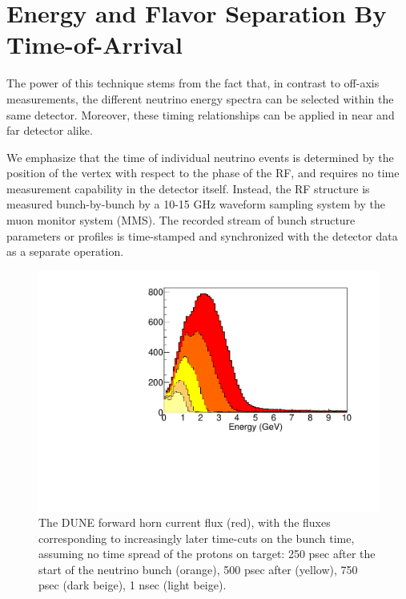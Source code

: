\section{Energy and Flavor Separation By Time-of-Arrival}
\label{mechanism}

The power of this technique stems from the fact that, in contrast to
off-axis measurements, the different neutrino energy spectra can be
selected within the same detector. Moreover, these timing
relationships can be applied in near and far detector alike. 

We emphasize that the time of individual neutrino events is determined
by the position of the vertex with respect to the phase of the RF, and
requires no time measurement capability in the detector
itself. Instead, the RF
structure is measured bunch-by-bunch by a 10-15 GHz waveform sampling
system by the muon monitor system (MMS). The recorded stream of bunch 
structure parameters or profiles is time-stamped and synchronized with
the detector data as a separate operation.

\begin{figure}[t]
	\begin{center}
        \includegraphics[width=0.5\linewidth]{Figures/2018.10.10_LBNFtiming/DUNEbeam_truetimingB.pdf}
	\end{center}
	\caption{The DUNE forward horn current flux (red), with the
          fluxes corresponding to increasingly later time-cuts on the
          bunch time, assuming no time spread of the protons on
          target: 250 psec after the start of the neutrino bunch
          (orange), 500 psec after (yellow), 750 psec (dark beige), 1
          nsec (light beige).}
		\label{fig:Dunebeam_truetimingB}
\end{figure}


